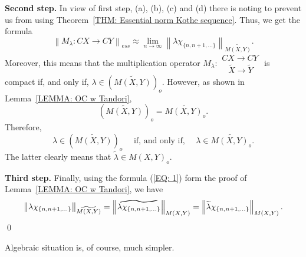 \documentclass[11pt]{amsart}
\theoremstyle{definition}
\theoremstyle{definition}
\theoremstyle{definition}
\theoremstyle{definition}
\theoremstyle{definition}
\theoremstyle{definition}
\theoremstyle{definition}
\theoremstyle{definition}
\numberwithin{equation}{section}
\numberwithin{equation}{section}
\numberwithin{equation}{section}
\theoremstyle{definition}
\theoremstyle{definition}
\theoremstyle{definition}
\theoremstyle{definition}
\theoremstyle{definition}
\theoremstyle{definition}
\newcommand{\norm}[1]{\left\lVert#1\right\rVert}
\renewenvironment{proof}{\noindent {\bf Proof.}}{\qed}
\begin{document}
\begin{proof}
	{\bf Second step.} In view of first step, (a), (b), (c) and (d) there is noting to prevent us from using Theorem~\ref{THM: Essential norm Kothe sequence}.
	Thus, we get the formula
	\begin{equation*}
		\norm{M_{\lambda} \colon  CX \rightarrow CY }_{ess}
			\approx \lim\limits_{n \rightarrow \infty} \norm{\lambda\chi_{\{n, n+1, ...\}}}_{\widetilde{M(X,Y)}}.
	\end{equation*}
	Moreover, this means that the multiplication operator $M_{\lambda} \colon \begin{array}{l} CX \rightarrow CY \\ \;\;\: \widetilde{X} \rightarrow \widetilde{Y} \end{array}$
	is compact if, and only if, $\lambda \in \left( \widetilde{M(X,Y)} \right)_o$.
	However, as shown in Lemma~\ref{LEMMA: OC w Tandori},
	\begin{equation*}
		\left( \widetilde{M(X,Y)} \right)_o = \widetilde{M(X,Y)_o}.
	\end{equation*}
	Therefore,
	\begin{equation*}
		\lambda \in \left( \widetilde{M(X,Y)} \right)_o \quad \text{ if, and only if, } \quad \lambda \in \widetilde{M(X,Y)_o}.
	\end{equation*}
	The latter clearly means that $\widetilde{\lambda} \in M(X,Y)_o$.
	
	{\bf Third step.} Finally, using the formula (\ref{EQ: 1}) form the proof of Lemma~\ref{LEMMA: OC w Tandori}, we have
	\begin{equation*}
		\norm{\lambda\chi_{\{n, n+1, ...\}}}_{\widetilde{M(X,Y)}}
			= \norm{\stackon[-8pt]{$\lambda \chi_{\{n, n+1, ...\}}$}{\vstretch{1.5}{\hstretch{2.4}{\widetilde{\phantom{\;\;\;\;\;\;\;\;}}}}}}_{M(X,Y)}
			= \norm{\widetilde{\lambda} \chi_{\{n, n+1, ...\}}}_{M(X,Y)}.
	\end{equation*}
\end{proof}

Algebraic situation is, of course, much simpler.
\end{document}

